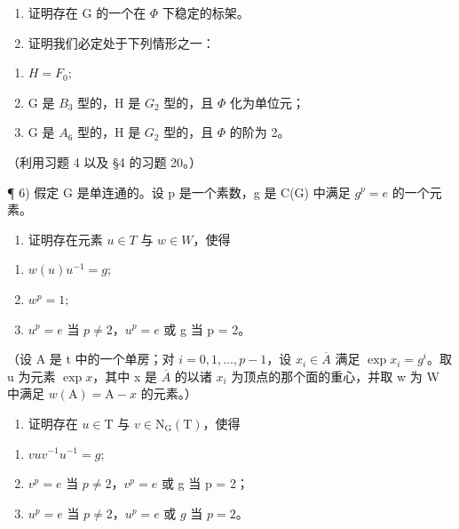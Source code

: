 \begin{enumerate}
\begin{enumerate}
\def\labelenumi{\alph{enumi})}
\item
  证明存在 \(\mathrm{G}\) 的一个在 \(\varPhi\) 下稳定的标架。
\item
  证明我们必定处于下列情形之一：
\end{enumerate}

\begin{enumerate}
\def\labelenumi{(\roman{enumi})}
\item
  \(H = F_{0};\)
\item
  G 是 \(B_{3}\) 型的，H 是 \(G_{2}\) 型的，且 \(\Phi\) 化为单位元；
\item
  G 是 \(A_{6}\) 型的，H 是 \(G_{2}\) 型的，且 \(\Phi\) 的阶为 2。
\end{enumerate}

（利用习题 4 以及 §4 的习题 20。）

¶ 6) 假定 G 是单连通的。设 p 是一个素数，g 是 C(G) 中满足 \(g^{p} = e\) 的一个元素。

\begin{enumerate}
\def\labelenumi{\alph{enumi})}
\tightlist
\item
  证明存在元素 \(u \in T\) 与 \(w \in W\)，使得
\end{enumerate}

\begin{enumerate}
\def\labelenumi{(\roman{enumi})}
\item
  \(w(u)u^{-1} = g;\)
\item
  \(w^{p} = 1;\)
\item
  \(u^{p} = e\) 当 \(p \neq 2\)，\(u^{p} = e\) 或 g 当 p = 2。
\end{enumerate}

（设 A 是 t 中的一个单房；对 \(i = 0, 1, \ldots, p - 1\)，设 \(x_i \in \overline{A}\) 满足 \(\exp x_i = g^i\)。取 u 为元素 \(\exp x\)，其中 x 是 \(\overline{A}\) 的以诸 \(x_i\) 为顶点的那个面的重心，并取 w 为 W 中满足 \(w(\mathrm{A}) = \mathrm{A} - x\) 的元素。）

\begin{enumerate}
\def\labelenumi{\alph{enumi})}
\setcounter{enumi}{1}
\tightlist
\item
  证明存在 \(u \in \mathrm{T}\) 与 \(v \in \mathrm{N}_{\mathrm{G}}(\mathrm{T})\)，使得
\end{enumerate}

\begin{enumerate}
\def\labelenumi{(\roman{enumi})}
\item
  \(vuv^{-1}u^{-1}=g;\)
\item
  \(v^{p} = e\) 当 \(p \neq 2\)，\(v^{p} = e\) 或 g 当 p = 2；
\item
  \(u^{p} = e\) 当 \(p \neq 2\)，\(u^{p} = e\) 或 \(g\) 当 \(p = 2\)。
\end{enumerate}


\end{enumerate}
